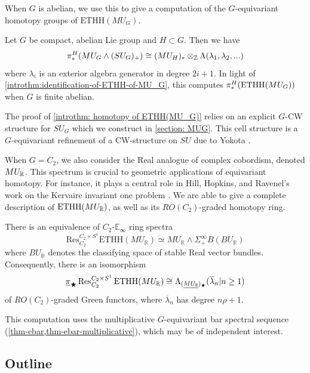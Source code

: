 When $G$ is abelian, we use this to give a computation of the $G$-equivariant homotopy groups of $\mathrm{ETHH}(MU_G)$. 

\begin{introtheorem}\label{introthm: homotopy of ETHH(MU_G)}
    Let $G$ be compact, abelian Lie group and $H \subset G$. Then we have
    \[
        \pi^H_*(MU_G \wedge (SU_G)_+) \cong (MU_H)_* \otimes_{\mathbb{Z}} \Lambda(\lambda_1,\lambda_2,...)
    \]
    where $\lambda_i$ is an exterior algebra generator in degree $2i+1$. In light of \cref{introthm:identification-of-ETHH-of-MU_G}, this computes $\pi^H_*(\mathrm{ETHH}(MU_G))$ when $G$ is finite abelian.
\end{introtheorem}

The proof of \cref{introthm: homotopy of ETHH(MU_G)} relies on an explicit $G$-CW structure for $SU_G$ which we construct in \cref{section: MUG}.  This cell structure is a $G$-equivariant refinement of a CW-structure on $SU$ due to Yokota \cite{Yok56}.

When $G=C_2$, we also consider the Real analogue of complex cobordism, denoted $MU_{\mathbb{R}}$.  This spectrum is crucial to geometric applications of equivariant homotopy. For instance, it plays a central role in Hill, Hopkins, and Ravenel's work on the Kervaire invariant one problem \cite{HHR}. We are able to give a complete description of $\mathrm{ETHH}(MU_{\mathbb{R}})$, as well as its $RO(C_2)$-graded homotopy ring.

\begin{introtheorem}\label{introthm-ETHH-MUR}
    There is an equivalence of $C_2$-$\mathbb{E}_\infty$ ring spectra
    \[
        \mathrm{Res}_{C_2}^{C_2 \times S^1} \mathrm{ETHH}(MU_\mathbb{R}) \simeq MU_\mathbb{R} \wedge \Sigma^\infty _+ B(BU_\mathbb{R})
    \]
    where $BU_{\mathbb{R}}$ denotes the classifying space of stable Real vector bundles.  Consequently, there is an isomorphism 
    \[ 
        \underline{\pi}_\bigstar \operatorname{Res}_{C_2}^{C_2 \times S^1} \mathrm{ETHH}(MU_{\mathbb{R}}) \cong \Lambda_{(\underline{MU_{\mathbb{R}}})_\bigstar} (\overline{\lambda}_n | n \geq 1)
    \]
    of $RO(C_2)$-graded Green functors, where $\overline{\lambda}_n$ has degree $n \rho+1$.
\end{introtheorem}


This computation uses the multiplicative $G$-equivariant bar spectral sequence (\cref{thm-ebar,thm-ebar-multiplicative}), which may be of independent interest.

\subsection{Outline}

